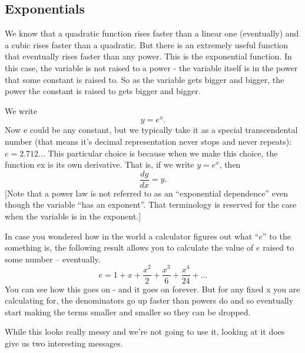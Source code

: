 \subsection*{Exponentials}
We know that a quadratic function rises faster than a linear one (eventually) and a cubic rises faster than a quadratic.
But there is an extremely useful function that eventually rises faster than any power.
This is the exponential function.
In this case, the variable is not raised to a power - the variable itself is in the power that some constant is raised to.
So as the variable gets bigger and bigger, the power the constant is raised to gets bigger and bigger.
\par
We write
\[ y = e^{x} \text{.} \]
Now e could be any constant, but we typically take it as a special transcendental number (that means it's decimal representation never stops and never repeats): $e = 2.712...$
This particular choice is because when we make this choice, the function ex is its own derivative.
That is, if we write $y = e^{x}$, then
\[ \frac{dy}{dx} = y \text{.} \]
[Note that a power law is not referred to as an ``exponential dependence'' even though the variable ``has an exponent''.
That terminology is reserved for the case when the variable is in the exponent.]
\par
In case you wondered how in the world a calculator figures out what ``$e$'' to the something is, the following result allows you to calculate the value of $e$ raised to some number -- eventually.
\[ e = 1 + x + \frac{x^{2}}{2} + \frac{x^{3}}{6} + \frac{x^{4}}{24}+... \]
You can see how this goes on - and it goes on forever.
But for any fixed x you are calculating for, the denominators go up faster than powers do and so eventually start making the terms smaller and smaller so they can be dropped.
\par 
While this looks really messy and we're not going to use it, looking at it does give us two interesting messages.
